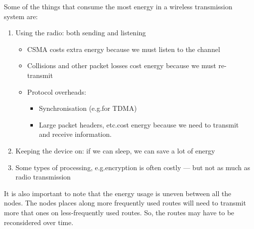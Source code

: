 Some of the things that consume the most energy in a wireless transmission system are:
\begin{enumerate}[noitemsep]
\item Using the radio: both sending and listening
  \begin{itemize}[noitemsep]
  \item CSMA costs extra energy because we must listen to the channel
  \item Collisions and other packet losses cost energy because we must re-transmit
  \item Protocol overheads:
    \begin{itemize}[noitemsep]
    \item Synchronisation (e.g.\@ for TDMA)
    \item Large packet headers, etc.\@ cost energy because we need to transmit and receive information.
    \end{itemize}
  \end{itemize}

\item Keeping the device on: if we can sleep, we can save a lot of
  energy
\item Some types of processing, e.g.\@ encryption is often costly --- but not as much as radio transmission
\end{enumerate}

\begin{remark*}
  It is also important to note that the energy usage is uneven between all the nodes.
  The nodes places along more frequently used routes will need to transmit more that ones on less-frequently used routes.
  So, the routes may have to be reconsidered over time.
\end{remark*}

